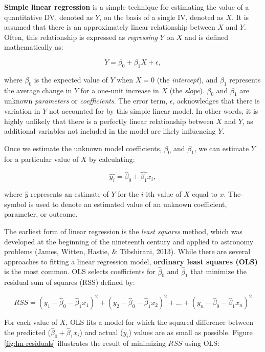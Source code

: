 \documentclass[
]{book}
\begin{document}
\textbf{Simple linear regression} is a simple technique for estimating the value of a quantitative DV, denoted as \(Y\), on the basis of a single IV, denoted as \(X\). It is assumed that there is an approximately linear relationship between \(X\) and \(Y\). Often, this relationship is expressed as \emph{regressing} \(Y\) on \(X\) and is defined mathematically as:

\[ Y = \beta_0 + \beta_1 X + \epsilon, \]

where \(\beta_0\) is the expected value of \(Y\) when \(X = 0\) (the \emph{intercept}), and \(\beta_1\) represents the average change in \(Y\) for a one-unit increase in \(X\) (the \emph{slope}). \(\beta_0\) and \(\beta_1\) are unknown \emph{parameters} or \emph{coefficients}. The error term, \(\epsilon\), acknowledges that there is variation in \(Y\) not accounted for by this simple linear model. In other words, it is highly unlikely that there is a perfectly linear relationship between \(X\) and \(Y\), as additional variables not included in the model are likely influencing \(Y\).

Once we estimate the unknown model coefficients, \(\beta_0\) and \(\beta_1\), we can estimate \(Y\) for a particular value of \(X\) by calculating:

\[ \hat{y_i} = \hat{\beta}_0 + \hat{\beta_1}x_i, \]

where \(\hat{y}\) represents an estimate of \(Y\) for the \(i\)-ith value of \(X\) equal to \(x\). The \(\hat{}\) symbol is used to denote an estimated value of an unknown coefficient, parameter, or outcome.

The earliest form of linear regression is the \emph{least squares} method, which was developed at the beginning of the nineteenth century and applied to astronomy problems (James, Witten, Hastie, \& Tibshirani, 2013). While there are several approaches to fitting a linear regression model, \textbf{ordinary least squares (OLS)} is the most common. OLS selects coefficients for \(\hat{\beta}_0\) and \(\hat{\beta}_1\) that minimize the residual sum of squares (RSS) defined by:

\[RSS = (y_1 - \hat{\beta}_0 - \hat{\beta}_1x_1)^2 + (y_2 - \hat{\beta}_0 - \hat{\beta}_1x_2)^2 + {...} + (y_n - \hat{\beta}_0 - \hat{\beta}_1x_n)^2\]

For each value of \(X\), OLS fits a model for which the squared difference between the predicted (\(\hat{\beta}_0 + \hat{\beta}_1x_i\)) and actual (\(y_i\)) values are as small as possible. Figure \ref{fig:lm-residuals} illustrates the result of minimizing \(RSS\) using OLS:
\end{document}
